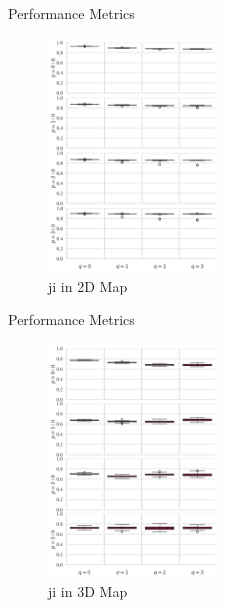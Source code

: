 \documentclass{beamer}
\begin{document}
\begin{frame}{Performance Metrics}
\begin{figure}
\centering
\includegraphics[width=0.4\textwidth]{images/ji2D.png}
\caption{\acrlong{ji} in 2D Map}
\end{figure}
\end{frame}

\begin{frame}{Performance Metrics}
\begin{figure}
\centering
\includegraphics[width=0.4\textwidth]{images/ji3D.png}
\caption{\acrlong{ji} in 3D Map}
\end{figure}
\end{frame}

\def\arraystretch{0.8}
\setlength{\tabcolsep}{4pt}
\abovecaptionskip=0pt
\belowcaptionskip=1pt 
\end{document}
